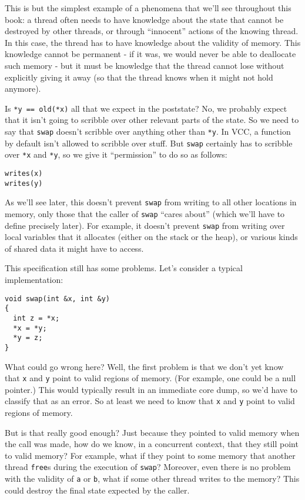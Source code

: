 \documentclass{report}
\newcommand{\Q}[1]{\lstinline~#1~}
\newcommand{\VCC}{VCC}
\begin{document}
This is but the simplest example of a phenomena that we'll see
throughout this book: a thread often needs to have knowledge about the
state that cannot be destroyed by other threads, or through
``innocent'' actions of the knowing thread. In this case, the thread
has to have knowledge about the validity of memory. This knowledge
cannot be permanent - if it was, we would never be able to deallocate
such memory - but it must be knowledge that the thread cannot lose
without explicitly giving it away (so that the thread knows when it
might not hold anymore).

Is \Q{*y == old(*x)} all that we expect in the poststate? No, we
probably expect that it isn't going to scribble over other relevant
parts of the state. So we need to say that \Q{swap} doesn't scribble
over anything other than \Q{*y}. In \VCC, a function by default isn't
allowed to scribble over stuff. But \Q{swap} certainly has to scribble
over \Q{*x} and \Q{*y}, so we give it ``permission'' to do so as
follows:
\begin{lstlisting}
writes(x)
writes(y)
\end{lstlisting}
As we'll see later, this doesn't prevent \Q{swap} from writing to all
other locations in memory, only those that the caller of \Q{swap}
``cares about'' (which we'll have to define precisely later). For
example, it doesn't prevent \Q{swap} from writing over local variables
that it allocates (either on the stack or the heap), or various kinds
of shared data it might have to access.

This specification still has some problems. Let's consider a typical 
implementation:
\begin{lstlisting}
void swap(int &x, int &y)
{
  int z = *x;
  *x = *y;
  *y = z;
}
\end{lstlisting}
What could go wrong here? Well, the first problem is that we don't yet
know that \Q{x} and \Q{y} point to valid regions of memory. (For
example, one could be a null pointer.) This would typically result in
an immediate core dump, so we'd have to classify that as an error. So
at least we need to know that \Q{x} and \Q{y} point to valid regions
of memory.

But is that really good enough? Just because they pointed to valid
memory when the call was made, how do we know, in a concurrent
context, that they still point to valid memory? For example, what if
they point to some memory that another thread \Q{free}s during the
execution of \Q{swap}?  Moreover, even there is no problem with the
validity of \Q{a} or \Q{b}, what if some other thread writes to the
memory? This could destroy the final state expected by the caller.
\end{document}

